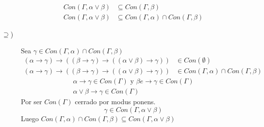 \begin{ejercicio}
\begin{description}
\begin{align*}
                    Con(\Gamma,\alpha\lor\beta) &\subseteq Con(\Gamma,\beta) \\
                    Con(\Gamma,\alpha\lor\beta) &\subseteq Con(\Gamma,\alpha)\cap Con(\Gamma,\beta)
                \end{align*}
        \item [$\supseteq$)] Sea $\gamma\in Con(\Gamma,\alpha)\cap Con(\Gamma,\beta)$
            \begin{align*}
                (\alpha\rightarrow\gamma)\rightarrow((\beta\rightarrow\gamma)\rightarrow((\alpha\lor\beta)\rightarrow\gamma))&\in Con(\emptyset ) \\
                (\alpha\rightarrow\gamma)\rightarrow((\beta\rightarrow\gamma)\rightarrow((\alpha\lor\beta)\rightarrow\gamma)) &\in  Con(\Gamma,\alpha) \cap Con(\Gamma,\beta)
            \end{align*}
            \begin{gather*}
                \alpha\rightarrow\gamma\in Con(\Gamma) \text{\ y\ } \beta e\rightarrow\gamma\in Con(\Gamma) \\
                \alpha\lor\beta\rightarrow\gamma\in Con(\Gamma)
            \end{gather*}
            Por ser $Con(\Gamma)$ cerrado por modus ponens.
            \begin{equation*}
                \gamma\in Con(\Gamma,\alpha\lor\beta)
            \end{equation*}
            Luego $Con(\Gamma,\alpha)\cap Con(\Gamma,\beta)\subseteq Con(\Gamma,\alpha\lor\beta)$
    \end{description}
\end{ejercicio}


